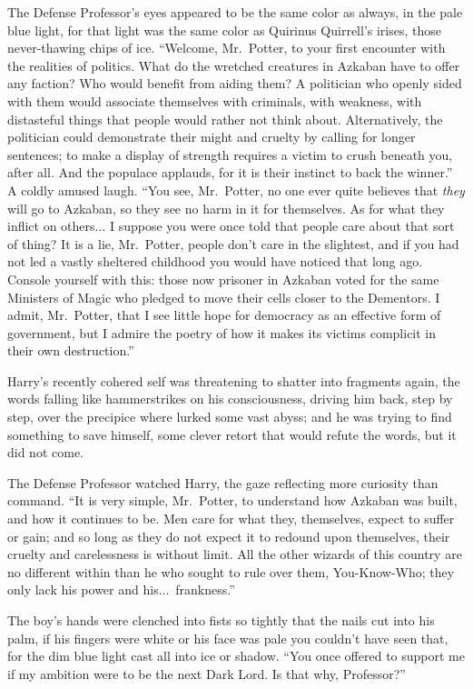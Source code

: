 The Defense Professor’s eyes appeared to be the same color as always, in the pale blue light, for that light was the same color as Quirinus Quirrell’s irises, those never-thawing chips of ice. “Welcome, Mr.~Potter, to your first encounter with the realities of politics. What do the wretched creatures in Azkaban have to offer any faction? Who would benefit from aiding them? A politician who openly sided with them would associate themselves with criminals, with weakness, with distasteful things that people would rather not think about. Alternatively, the politician could demonstrate their might and cruelty by calling for longer sentences; to make a display of strength requires a victim to crush beneath you, after all. And the populace applauds, for it is their instinct to back the winner.” A coldly amused laugh. “You see, Mr.~Potter, no one ever quite believes that \emph{they} will go to Azkaban, so they see no harm in it for themselves. As for what they inflict on others... I suppose you were once told that people care about that sort of thing? It is a lie, Mr.~Potter, people don’t care in the slightest, and if you had not led a vastly sheltered childhood you would have noticed that long ago. Console yourself with this: those now prisoner in Azkaban voted for the same Ministers of Magic who pledged to move their cells closer to the Dementors. I admit, Mr.~Potter, that I see little hope for democracy as an effective form of government, but I admire the poetry of how it makes its victims complicit in their own destruction.”

Harry’s recently cohered self was threatening to shatter into fragments again, the words falling like hammerstrikes on his consciousness, driving him back, step by step, over the precipice where lurked some vast abyss; and he was trying to find something to save himself, some clever retort that would refute the words, but it did not come.

The Defense Professor watched Harry, the gaze reflecting more curiosity than command. “It is very simple, Mr.~Potter, to understand how Azkaban was built, and how it continues to be. Men care for what they, themselves, expect to suffer or gain; and so long as they do not expect it to redound upon themselves, their cruelty and carelessness is without limit. All the other wizards of this country are no different within than he who sought to rule over them, You-Know-Who; they only lack his power and his...\ frankness.”

The boy’s hands were clenched into fists so tightly that the nails cut into his palm, if his fingers were white or his face was pale you couldn’t have seen that, for the dim blue light cast all into ice or shadow. “You once offered to support me if my ambition were to be the next Dark Lord. Is that why, Professor?”

